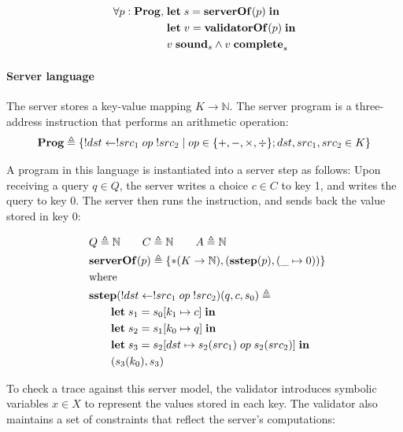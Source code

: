 \documentclass{article}
\theoremstyle{definition}
\newcommand{\Nat}{\mathbb N}
\newcommand{\Let}{\ottkw{let}\;}
\newcommand{\In}{\;\ottkw{in}}
\newcommand{\letin}[2]{\Let#1=#2\In}
\newcommand{\existT}[2]{\{*#1,#2\}}
\newcommand{\sstep}{\ottkw{sstep}}
\newcommand{\sound}{\ottkw{sound}}
\newcommand{\issound}[2]{#1\;\sound_{#2}}
\newcommand{\complete}{\ottkw{complete}}
\newcommand{\iscomplete}[2]{#1\;\complete_{#2}}
\newcommand{\Prog}{\ottkw{Prog}}
\newcommand{\serverOf}{\ottkw{serverOf}}
\newcommand{\validatorOf}{\ottkw{validatorOf}}
\begin{document}
\begin{align*}
  \forall p:\Prog,\;&\letin{s}{\serverOf(p)}\\
  &\letin{v}{\validatorOf(p)}\\
  &\issound{v}{s}\wedge\iscomplete{v}{s}
\end{align*}

\paragraph{Server language}
The server stores a key-value mapping $K\to\Nat$.  The server program is a
three-address instruction that performs an arithmetic operation:
\[\Prog \triangleq \{!dst\gets !src_1\;op\;!src_2\mid op\in\{+,-,\times,\div\};
dst,src_1,src_2\in K\}\]

A program in this language is instantiated into a server step as follows: Upon
receiving a query $q\in Q$, the server writes a choice $c\in C$ to key 1, and
writes the query to key 0.  The server then runs the instruction, and sends back
the value stored in key 0:

\begin{align*}
  \rlap{$Q\triangleq\Nat\qquad C\triangleq\Nat\qquad A\triangleq\Nat$}\\
  \rlap{$\serverOf(p)\triangleq\existT{(K\to\Nat)}{(\sstep(p), (\_\mapsto0))}$}\\
  \rlap{where}\\
  \rlap{$\sstep(!dst\gets !src_1\;op\;!src_2)(q,c,s_0)\triangleq$}\\
  &\qquad\letin{s_1}{s_0 [k_1\mapsto c]}\\
  &\qquad\letin{s_2}{s_1 [k_0\mapsto q]}\\
  &\qquad\letin{s_3}{s_2 [dst\mapsto s_2(src_1)\;op\;s_2(src_2)]}\\
  &\qquad(s_3(k_0), s_3)
\end{align*}

To check a trace against this server model, the validator introduces symbolic
variables $x\in X$ to represent the values stored in each key.  The validator
also maintains a set of constraints that reflect the server's computations:
\end{document}
